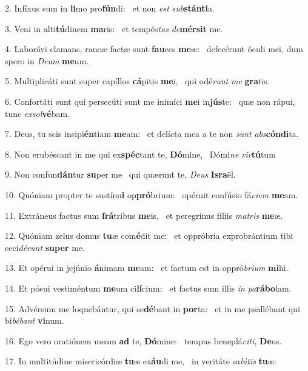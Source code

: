 2. Infíxus sum in \textbf{li}mo pro\textbf{fún}di: \ast\  et non \textit{est} \textit{sub}\textbf{stán}\textbf{ti}a.\

3. Veni in alti\textbf{tú}dinem \textbf{ma}ris: \ast\  et tempés\textit{tas} \textit{de}\textbf{mér}\textbf{sit} me.\

4. Laborávi clamans, raucæ factæ sunt \textbf{fau}ces \textbf{me}æ: \ast\  defecérunt óculi mei, dum spero in \textit{De}\textit{um} \textbf{me}um.\

5. Multiplicáti sunt super capíllos \textbf{cá}pitis \textbf{me}i, \ast\  qui odé\textit{runt} \textit{me} \textbf{gra}tis.\

6. Confortáti sunt qui persecúti sunt me inimíci \textbf{me}i in\textbf{jús}te: \ast\  quæ non rápui, tunc \textit{ex}\textit{sol}\textbf{vé}bam.\

7. Deus, tu scis insipi\textbf{én}tiam \textbf{me}am: \ast\  et delícta mea a te non \textit{sunt} \textit{abs}\textbf{cón}\textbf{di}ta.\

8. Non erubéscant in me qui ex\textbf{spéc}tant te, \textbf{Dó}mine, \ast\  Dómi\textit{ne} \textit{vir}\textbf{tú}tum\

9. Non confun\textbf{dán}tur \textbf{su}per me \ast\  qui quærunt te, \textit{De}\textit{us} \textbf{Is}\textbf{ra}ël.\

10. Quóniam propter te sustínu\textbf{i} op\textbf{pró}brium: \ast\  opéruit confúsio fá\textit{ci}\textit{em} \textbf{me}am.\

11. Extráneus factus sum \textbf{frá}tribus \textbf{me}is, \ast\  et peregrínus fíliis \textit{ma}\textit{tris} \textbf{me}æ.\

12. Quóniam zelus domus \textbf{tu}æ com\textbf{é}dit me: \ast\  et oppróbria exprobrántium tibi ceci\textit{dé}\textit{runt} \textbf{su}\textbf{per} me.\

13. Et opérui in jejúnio \textbf{á}nimam \textbf{me}am: \ast\  et factum est in oppró\textit{bri}\textit{um} \textbf{mi}hi.\

14. Et pósui vestiméntum \textbf{me}um ci\textbf{lí}cium: \ast\  et factus sum illis \textit{in} \textit{pa}\textbf{rá}\textbf{bo}lam.\

15. Advérsum me loquebántur, qui se\textbf{dé}bant in \textbf{por}ta: \ast\  et in me psallébant qui bi\textit{bé}\textit{bant} \textbf{vi}num.\

16. Ego vero oratiónem meam \textbf{ad} te, \textbf{Dó}mine: \ast\  tempus beneplá\textit{ci}\textit{ti}, \textbf{De}us.\

17. In multitúdine misericórdiæ \textbf{tu}æ ex\textbf{áu}di me, \ast\  in veritáte sa\textit{lú}\textit{tis} \textbf{tu}æ:\

